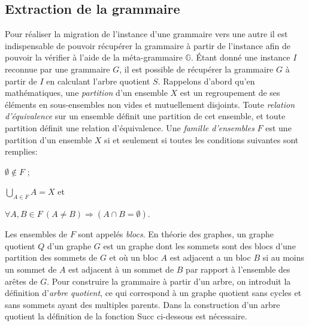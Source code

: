 \subsection{Extraction de la grammaire}
Pour réaliser la migration de l'instance d'une grammaire vers une autre il est indispensable de pouvoir récupérer la grammaire à partir de l'instance afin de pouvoir la vérifier à l'aide de la méta-grammaire $\mathbb{G}$.
Étant donné une instance $I$ reconnue par une grammaire $G$, il est possible de récupérer la grammaire $G$ à partir de $I$ en calculant l'arbre quotient $S$.
Rappelons d'abord qu'en mathématiques, une \textit{partition} d'un ensemble $X$ est un regroupement de ses éléments en sous-ensembles non vides et mutuellement disjoints.
Toute \textit{relation d'équivalence} sur un ensemble définit une partition de cet ensemble, et toute partition définit une relation d'équivalence.
Une \textit{famille d'ensembles} $F$ est une partition d'un ensemble $X$ si et seulement si toutes les conditions suivantes sont remplies:
\begin{enumerate*}[label=(\roman*)]
    \item $\emptyset \not\in F$ ;
    \item $\bigcup_{A \in F}A = X$ et
    \item $\forall A, B  \in F~ (A \neq B) \Rightarrow ( A \cap B = \emptyset)$.
\end{enumerate*}
Les ensembles de $F$ sont appelés \textit{blocs}.
En théorie des graphes, un graphe quotient $Q$ d'un graphe $G$ est un graphe dont les sommets sont des blocs d'une partition des sommets de $G$ et où un bloc $A$ est adjacent a un bloc $B$ si au moins un sommet de $A$ est adjacent à un sommet de $B$ par rapport à l'ensemble des arêtes de $G$.
Pour construire la grammaire à partir d'un arbre, on introduit la définition d'\textit{arbre quotient}, ce qui correspond à un graphe quotient sans cycles et sans sommets ayant des multiples parents.
Dans la construction d'un arbre quotient la définition de la fonction \textsf{Succ} ci-dessous est nécessaire.

